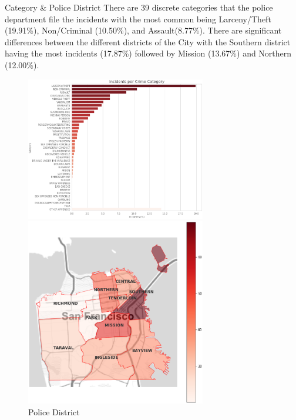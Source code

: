 \documentclass[
 size=14pt,
 paper=smartboard,  %
 mode=present, 		%
 display=slides, 	%
 style=tuliplab,  	%
 pauseslide,
 fleqn,leqno]{powerdot}
\begin{document}




\begin{slide}{Category \& Police District}
  There are 39 discrete categories that the police department file the incidents with the most common being 
  Larceny/Theft (19.91\%), Non/Criminal (10.50\%), and Assault(8.77\%).
  There are significant differences between the different districts of the City with the Southern district 
  having the most incidents (17.87\%) followed by Mission (13.67\%) and Northern (12.00\%).
  \begin{figure}[htbp]
    \centering
    \begin{minipage}[t]{0.48\textwidth}
      \centering
      \includegraphics[width=0.7\textwidth]{kaggle/9.eps}
      \vspace{0.4em}
      \caption{Category}
    \end{minipage}
    \begin{minipage}[t]{0.48\textwidth}
      \centering
      \includegraphics[width=0.7\textwidth]{kaggle/10.eps}
      \vspace{0.4em}
      \caption{Police District}
    \end{minipage}
  \end{figure}
\end{slide}
\end{document}
